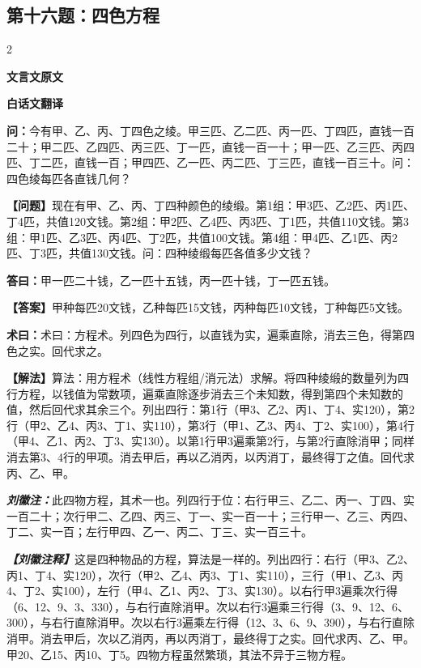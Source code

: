 \documentclass[10pt,a4paper]{article}
\newcommand{\wen}[1]{\textbf{\color{problemcolor}问：}#1\par}
\newcommand{\da}[1]{\textbf{答曰：}#1\par}
\newcommand{\shu}[1]{\textbf{术曰：}#1\par}
\newcommand{\liuhui}[1]{{\color{commentarycolor}\textit{\textbf{刘徽注：}}#1\par}}
\newcommand{\classicalheader}[1]{{\centering\large\bfseries\color{classicalcolor} #1\par\vspace{0.5em}}}
\newcommand{\wenmodern}[1]{\textbf{\color{moderncolor}【问题】}#1\par}
\newcommand{\damodern}[1]{\textbf{【答案】}#1\par}
\newcommand{\shumodern}[1]{\textbf{【解法】}#1\par}
\newcommand{\liuhuimodern}[1]{{\color{commentarycolor}\textit{\textbf{【刘徽注释】}}#1\par}}
\newcommand{\modernheader}[1]{{\centering\large\bfseries\color{moderncolor} #1\par\vspace{0.5em}}}
\newcommand{\problemsec}[1]{\subsection*{#1}}
\begin{document}
\problemsec{第十六题：四色方程}
\begin{paracol}{2}
\classicalheader{文言文原文}
\switchcolumn
\modernheader{白话文翻译}
\switchcolumn*

\wen{今有甲、乙、丙、丁四色之绫。甲三匹、乙二匹、丙一匹、丁四匹，直钱一百二十；甲二匹、乙四匹、丙三匹、丁一匹，直钱一百一十；甲一匹、乙三匹、丙四匹、丁二匹，直钱一百；甲四匹、乙一匹、丙二匹、丁三匹，直钱一百三十。问：四色绫每匹各直钱几何？}

\switchcolumn

\wenmodern{现在有甲、乙、丙、丁四种颜色的绫缎。第1组：甲3匹、乙2匹、丙1匹、丁4匹，共值120文钱。第2组：甲2匹、乙4匹、丙3匹、丁1匹，共值110文钱。第3组：甲1匹、乙3匹、丙4匹、丁2匹，共值100文钱。第4组：甲4匹、乙1匹、丙2匹、丁3匹，共值130文钱。问：四种绫缎每匹各值多少文钱？}

\switchcolumn*

\da{甲一匹二十钱，乙一匹十五钱，丙一匹十钱，丁一匹五钱。}

\switchcolumn

\damodern{甲种每匹20文钱，乙种每匹15文钱，丙种每匹10文钱，丁种每匹5文钱。}

\switchcolumn*

\shu{术曰：方程术。列四色为四行，以直钱为实，遍乘直除，消去三色，得第四色之实。回代求之。}

\switchcolumn

\shumodern{算法：用方程术（线性方程组/消元法）求解。将四种绫缎的数量列为四行方程，以钱值为常数项，遍乘直除逐步消去三个未知数，得到第四个未知数的值，然后回代求其余三个。列出四行：第1行（甲3、乙2、丙1、丁4、实120），第2行（甲2、乙4、丙3、丁1、实110），第3行（甲1、乙3、丙4、丁2、实100），第4行（甲4、乙1、丙2、丁3、实130）。以第1行甲3遍乘第2行，与第2行直除消甲；同样消去第3、4行的甲项。消去甲后，再以乙消丙，以丙消丁，最终得丁之值。回代求丙、乙、甲。}

\switchcolumn*

\liuhui{此四物方程，其术一也。列四行于位：右行甲三、乙二、丙一、丁四、实一百二十；次行甲二、乙四、丙三、丁一、实一百一十；三行甲一、乙三、丙四、丁二、实一百；左行甲四、乙一、丙二、丁三、实一百三十。}

\switchcolumn

\liuhuimodern{这是四种物品的方程，算法是一样的。列出四行：右行（甲3、乙2、丙1、丁4、实120），次行（甲2、乙4、丙3、丁1、实110），三行（甲1、乙3、丙4、丁2、实100），左行（甲4、乙1、丙2、丁3、实130）。以右行甲3遍乘次行得（6、12、9、3、330），与右行直除消甲。次以右行3遍乘三行得（3、9、12、6、300），与右行直除消甲。次以右行3遍乘左行得（12、3、6、9、390），与右行直除消甲。消去甲后，次以乙消丙，再以丙消丁，最终得丁之实。回代求丙、乙、甲。甲20、乙15、丙10、丁5。四物方程虽然繁琐，其法不异于三物方程。}

\end{paracol}
\end{document}
